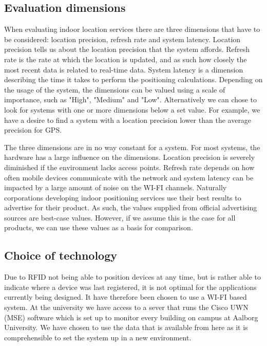 \subsection{Evaluation dimensions}
When evaluating indoor location services there are three dimensions that have to be considered: location precision, refresh rate and system latency. Location precision tells us about the location precision that the system affords. Refresh rate is the rate at which the location is updated, and as such how closely the most recent data is related to real-time data. System latency is a dimension describing the time it takes to perform the positioning calculations\cite{dimensions}. Depending on the usage of the system, the dimensions can be valued using a scale of importance, such as "High", "Medium" and "Low". Alternatively we can chose to look for systems with one or more dimensions below a set value. For example, we have a desire to find a system with a location precision lower than the average precision for GPS. 

The three dimensions are in no way constant for a system. For most systems, the hardware has a large influence on the dimensions. Location precision is severely diminished if the environment lacks access points. Refresh rate depends on how often mobile devices communicate with the network and system latency can be impacted by a large amount of noise on the WI-FI channels. Naturally corporations developing indoor positioning services use their best results to advertise for their product. As such, the values supplied from official advertising sources are best-case values. However, if we assume this is the case for all products, we can use these values as a basis for comparison.

\subsection{Choice of technology}\label{subsec:cisco}
Due to RFID not being able to position devices at any time, but is rather able to indicate where a device was last registered, it is not optimal for the applications currently being designed. It have therefore been chosen to use a WI-FI based system.
At the university we have access to a sever that runs the Cisco UWN (MSE) software which is set up to monitor every building on campus at Aalborg University. We have chosen to use the data that is available from here as it is comprehensible to set the system up in a new environment.

